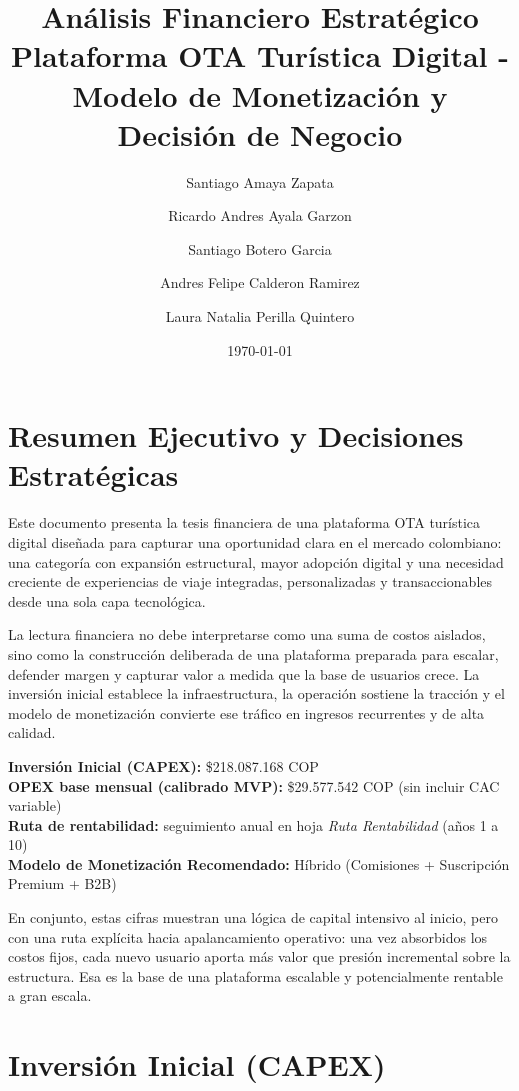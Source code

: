 \documentclass[12pt]{article}
\title{\textbf{Análisis Financiero Estratégico} \\ \large Plataforma OTA Turística Digital - Modelo de Monetización y Decisión de Negocio}
\author{
Santiago Amaya Zapata \\
\and
Ricardo Andres Ayala Garzon \\
\and
Santiago Botero Garcia \\
\and
Andres Felipe Calderon Ramirez \\
\and
Laura Natalia Perilla Quintero \\
}
\date{\today}
\begin{document}
\maketitle

\tableofcontents
\newpage

\section{Resumen Ejecutivo y Decisiones Estratégicas}

Este documento presenta la tesis financiera de una plataforma OTA turística digital diseñada para capturar una oportunidad clara en el mercado colombiano: una categoría con expansión estructural, mayor adopción digital y una necesidad creciente de experiencias de viaje integradas, personalizadas y transaccionables desde una sola capa tecnológica.

La lectura financiera no debe interpretarse como una suma de costos aislados, sino como la construcción deliberada de una plataforma preparada para escalar, defender margen y capturar valor a medida que la base de usuarios crece. La inversión inicial establece la infraestructura, la operación sostiene la tracción y el modelo de monetización convierte ese tráfico en ingresos recurrentes y de alta calidad.

\textbf{Inversión Inicial (CAPEX):} \$218.087.168 COP \\
\textbf{OPEX base mensual (calibrado MVP):} \$29.577.542 COP (sin incluir CAC variable) \\
\textbf{Ruta de rentabilidad:} seguimiento anual en hoja \textit{Ruta Rentabilidad} (años 1 a 10) \\
\textbf{Modelo de Monetización Recomendado:} Híbrido (Comisiones + Suscripción Premium + B2B)

En conjunto, estas cifras muestran una lógica de capital intensivo al inicio, pero con una ruta explícita hacia apalancamiento operativo: una vez absorbidos los costos fijos, cada nuevo usuario aporta más valor que presión incremental sobre la estructura. Esa es la base de una plataforma escalable y potencialmente rentable a gran escala.

\section{Inversión Inicial (CAPEX)}
\end{document}
